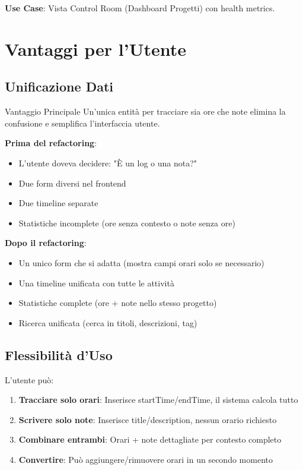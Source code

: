 \documentclass[11pt,a4paper]{article}
\begin{document}
\textbf{Use Case}: Vista Control Room (Dashboard Progetti) con health metrics.

\section{Vantaggi per l'Utente}

\subsection{Unificazione Dati}

\begin{successbox}{Vantaggio Principale}
Un'unica entità per tracciare sia ore che note elimina la confusione e semplifica l'interfaccia utente.
\end{successbox}

\textbf{Prima del refactoring}:
\begin{itemize}
    \item L'utente doveva decidere: "È un log o una nota?"
    \item Due form diversi nel frontend
    \item Due timeline separate
    \item Statistiche incomplete (ore senza contesto o note senza ore)
\end{itemize}

\textbf{Dopo il refactoring}:
\begin{itemize}
    \item Un unico form che si adatta (mostra campi orari solo se necessario)
    \item Una timeline unificata con tutte le attività
    \item Statistiche complete (ore + note nello stesso progetto)
    \item Ricerca unificata (cerca in titoli, descrizioni, tag)
\end{itemize}

\subsection{Flessibilità d'Uso}

L'utente può:

\begin{enumerate}
    \item \textbf{Tracciare solo orari}: Inserisce startTime/endTime, il sistema calcola tutto
    \item \textbf{Scrivere solo note}: Inserisce title/description, nessun orario richiesto
    \item \textbf{Combinare entrambi}: Orari + note dettagliate per contesto completo
    \item \textbf{Convertire}: Può aggiungere/rimuovere orari in un secondo momento
\end{enumerate}
\end{document}

